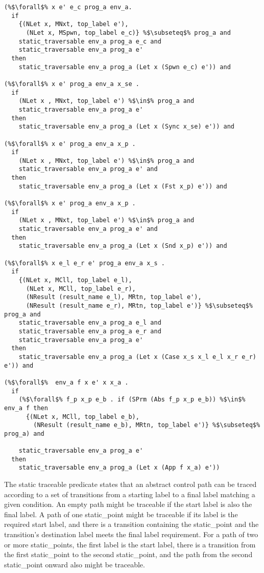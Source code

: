 \documentclass{article}
\begin{document}
\begin{lstlisting}[language=logic, escapechar=\%]
(%$\forall$% x e' e_c prog_a env_a.
  if
    {(NLet x, MNxt, top_label e'),
      (NLet x, MSpwn, top_label e_c)} %$\subseteq$% prog_a and
    static_traversable env_a prog_a e_c and
    static_traversable env_a prog_a e'
  then
    static_traversable env_a prog_a (Let x (Spwn e_c) e')) and

(%$\forall$% x e' prog_a env_a x_se .
  if
    (NLet x , MNxt, top_label e') %$\in$% prog_a and
    static_traversable env_a prog_a e'
  then
    static_traversable env_a prog_a (Let x (Sync x_se) e')) and

(%$\forall$% x e' prog_a env_a x_p .
  if
    (NLet x , MNxt, top_label e') %$\in$% prog_a and
    static_traversable env_a prog_a e' and
  then
    static_traversable env_a prog_a (Let x (Fst x_p) e')) and

(%$\forall$% x e' prog_a env_a x_p .
  if
    (NLet x , MNxt, top_label e') %$\in$% prog_a and
    static_traversable env_a prog_a e' and
  then
    static_traversable env_a prog_a (Let x (Snd x_p) e')) and

(%$\forall$% x e_l e_r e' prog_a env_a x_s .
  if
    {(NLet x, MCll, top_label e_l),
      (NLet x, MCll, top_label e_r),
      (NResult (result_name e_l), MRtn, top_label e'),
      (NResult (result_name e_r), MRtn, top_label e')} %$\subseteq$% prog_a and
    static_traversable env_a prog_a e_l and
    static_traversable env_a prog_a e_r and
    static_traversable env_a prog_a e'
  then
    static_traversable env_a prog_a (Let x (Case x_s x_l e_l x_r e_r) e')) and
  
(%$\forall$%  env_a f x e' x x_a .
  if
    (%$\forall$% f_p x_p e_b . if (SPrm (Abs f_p x_p e_b)) %$\in$% env_a f then 
      {(NLet x, MCll, top_label e_b),
        (NResult (result_name e_b), MRtn, top_label e')} %$\subseteq$% prog_a) and

    static_traversable env_a prog_a e'
  then
    static_traversable env_a prog_a (Let x (App f x_a) e'))

\end{lstlisting}


The static traceable predicate states that an abstract control path can be traced according to
a set of transitions from a starting label to a final label matching a given condition.  An
empty path might be traceable if the start label is also the final label.  A path of one
static\_point
might be traceable if its label is the required start label, and there is a transition
containing the static\_point and the transition's destination label meets the final label requirement.
For a path of two or more static\_points, the first label is the start label, there is a transition from
the first static\_point to the second static\_point, and the path from the second static\_point onward also might be
traceable.
\end{document}
